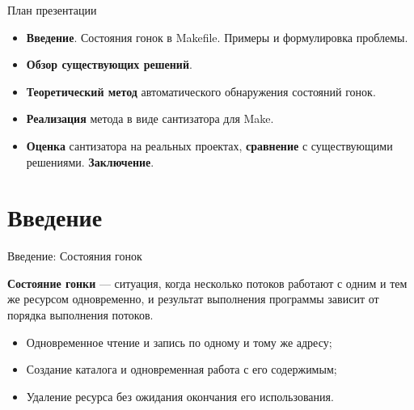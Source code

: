    \begin{frame}{План презентации}
        \begin{itemize}
            \setlength\itemsep{1.1em}
            \item \textbf{Введение}. Состояния гонок в Makefile. Примеры и формулировка проблемы.
            \item \textbf{Обзор существующих решений}.
            \item \textbf{Теоретический метод} автоматического обнаружения состояний гонок.
            \item \textbf{Реализация} метода в виде сантизатора для Make.
            \item \textbf{Оценка} сантизатора на реальных проектах, \textbf{сравнение} с существующими решениями. \textbf{Заключение}.
        \end{itemize}

    \end{frame}


    \section{Введение}

    \begin{frame}{Введение: Состояния гонок}

        \textbf{Состояние гонки} --- ситуация, когда несколько потоков работают с одним и тем же ресурсом одновременно,
        и результат выполнения программы зависит от порядка выполнения потоков.

        \begin{itemize}
            \item Одновременное чтение и запись по одному и тому же адресу;
            \item Создание каталога и одновременная работа с его содержимым;
            \item Удаление ресурса без ожидания окончания его использования.
        \end{itemize}


    \end{frame}


